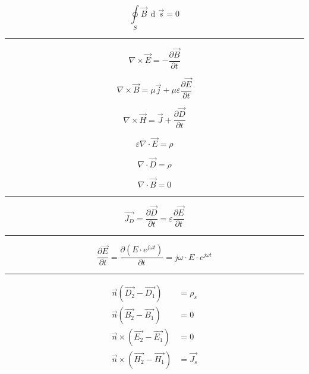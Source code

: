 \documentclass[12pt]{article}
\DeclareMathOperator{\der}{\operatorname{d}\!}
\newcommand{\grayrule}{{\color{lightgray} \hrule}}
\begin{document}
\begin{multicols}{3}
{    \begin{equation*}
        \oint\limits_S \Vec{B} \, \der\Vec{s} = 0
    \end{equation*}

}
\grayrule

\begin{equation*}
    \nabla \times \Vec{E} = - \frac{\partial \Vec{B}}{\partial t}
\end{equation*}

\begin{equation*}
    \nabla \times \Vec{B} = \mu \Vec{j} + \mu \varepsilon \frac{\partial \Vec{E}}{\partial t}
\end{equation*}

\begin{equation*}
    \nabla \times \Vec{H} = \Vec{J} + \frac{\partial \Vec{D}}{\partial t}
\end{equation*}

\begin{equation*}
    \varepsilon \nabla \cdot \Vec{E} = \rho
\end{equation*}

\begin{equation*}
    \nabla \cdot \Vec{D} = \rho
\end{equation*}

\begin{equation*}
    \nabla \cdot \Vec{B} = 0
\end{equation*}

\grayrule

\begin{equation*}
    \Vec{J_D} = \frac{\partial \Vec{D}}{\partial t}
        = \varepsilon \frac{\partial \Vec{E}}{\partial t}
\end{equation*}

\grayrule

\begin{equation*}
    \frac{\partial \Vec{E}}{\partial t}
        = \frac{\partial (E \cdot e^{j \omega t})}{\partial t}
        = j \omega \cdot E \cdot e^{j \omega t}
\end{equation*}

\grayrule

\begin{equation*}
    \begin{split}
        \Vec{n} (\Vec{D_2} - \Vec{D_1}) &= \rho_s \\
        \Vec{n} (\Vec{B_2} - \Vec{B_1}) &= 0 \\
        \Vec{n} \times (\Vec{E_2} - \Vec{E_1}) &= 0 \\
        \Vec{n} \times (\Vec{H_2} - \Vec{H_1}) &= \Vec{J_s}
    \end{split}
\end{equation*}


\end{multicols}
\end{document}
